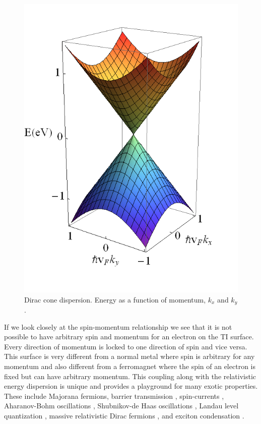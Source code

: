 \begin{figure}[h]
\center
\includegraphics[width=.6\textwidth]{include/cone.png}
\caption{Dirac cone dispersion. Energy as a function of momentum, $k_x$ and $k_y$.
}\label{cone}
\end{figure}
 
 If we look closely at the spin-momentum relationship we see that it is not possible to have arbitrary spin and momentum for an electron on the TI surface. Every direction of momentum is locked to one direction of spin and vice versa. 
 This surface is very different from a normal metal where spin is arbitrary for any momentum and also different from a ferromagnet where the spin of an electron is fixed but can have arbitrary momentum. This coupling along with the relativistic energy dispersion is unique and provides a playground for many exotic properties. These include Majorana fermions\cite{fu_superconducting_2008,hasan_colloquium:_2010,linder_unconventional_2010,qi_topological_2011}, barrier transmission \cite{seo_transmission_2010}, spin-currents \cite{yazyev_spin_2010,burkov_spin_2010}, Aharanov-Bohm oscillations \cite{peng_aharonov-bohm_2010}, Shubnikov-de Haas oscillations \cite{analytis_bulk_2010}, Landau level quantization \cite{cheng_landau_2010}, massive relativistic Dirac fermions \cite{liu_magnetic_2009, lu_massive_2010}, and exciton condensation \cite{seradjeh_exciton_2009}.
 
